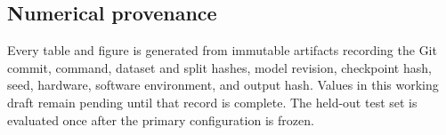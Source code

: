 \subsection{Numerical provenance}
Every table and figure is generated from immutable artifacts recording the Git commit, command, dataset and split hashes, model revision, checkpoint hash, seed, hardware, software environment, and output hash. Values in this working draft remain pending until that record is complete. The held-out test set is evaluated once after the primary configuration is frozen.
